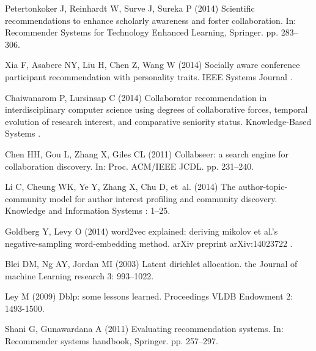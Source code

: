 \documentclass[10pt,letterpaper]{article}
\begin{document}
\begin{thebibliography}{10}
Petertonkoker J, Reinhardt W, Surve J, Sureka P (2014) Scientific
  recommendations to enhance scholarly awareness and foster collaboration.
\newblock In: Recommender Systems for Technology Enhanced Learning, Springer.
  pp. 283--306.

Xia F, Asabere NY, Liu H, Chen Z, Wang W (2014) Socially aware conference
  participant recommendation with personality traits.
\newblock IEEE Systems Journal .

Chaiwanarom P, Lursinsap C (2014) Collaborator recommendation in
  interdisciplinary computer science using degrees of collaborative forces,
  temporal evolution of research interest, and comparative seniority status.
\newblock Knowledge-Based Systems .

Chen HH, Gou L, Zhang X, Giles CL (2011) Collabseer: a search engine for
  collaboration discovery.
\newblock In: Proc. ACM/IEEE JCDL. pp. 231--240.

Li C, Cheung WK, Ye Y, Zhang X, Chu D, et~al. (2014) The author-topic-community
  model for author interest profiling and community discovery.
\newblock Knowledge and Information Systems : 1--25.

Goldberg Y, Levy O (2014) word2vec explained: deriving mikolov et al.'s
  negative-sampling word-embedding method.
\newblock arXiv preprint arXiv:14023722 .

Blei DM, Ng AY, Jordan MI (2003) Latent dirichlet allocation.
\newblock the Journal of machine Learning research 3: 993--1022.

Ley M (2009) Dblp: some lessons learned.
\newblock Proceedings VLDB Endowment 2: 1493-1500.

Shani G, Gunawardana A (2011) Evaluating recommendation systems.
\newblock In: Recommender systems handbook, Springer. pp. 257--297.

\end{thebibliography}


%
\end{document}
